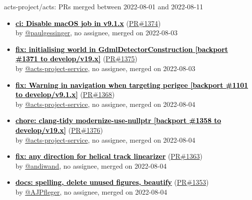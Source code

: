 \begin{frame}[allowframebreaks]{ acts-project/acts: PRs merged 
between 2022-08-01 and 2022-08-11
}
\begin{itemize}
    \item
    \prmerged\textbf{\href{https://github.com/acts-project/acts/pull/1374}{\textcolor{black}{ci: Disable macOS job in v9.1.x}}}
    (\href{https://github.com/acts-project/acts/pull/1374}{PR\#1374}) \\
    by \href{https://github.com/paulgessinger}{@paulgessinger}, {}no assignee, merged on 2022-08-03

    \item
    \prmerged\textbf{\href{https://github.com/acts-project/acts/pull/1375}{\textcolor{black}{fix: initialising world in GdmlDetectorConstruction [backport \#1371 to develop/v19.x]}}}
    (\href{https://github.com/acts-project/acts/pull/1375}{PR\#1375}) \\
    by \href{https://github.com/acts-project-service}{@acts-project-service}, {}no assignee, merged on 2022-08-03

    \item
    \prmerged\textbf{\href{https://github.com/acts-project/acts/pull/1368}{\textcolor{black}{fix: Warning in navigation when targeting perigee [backport \#1101 to develop/v9.1.x]}}}
    (\href{https://github.com/acts-project/acts/pull/1368}{PR\#1368}) \\
    by \href{https://github.com/acts-project-service}{@acts-project-service}, {}no assignee, merged on 2022-08-04

    \item
    \prmerged\textbf{\href{https://github.com/acts-project/acts/pull/1376}{\textcolor{black}{chore: clang-tidy modernize-use-nullptr [backport \#1358 to develop/v19.x]}}}
    (\href{https://github.com/acts-project/acts/pull/1376}{PR\#1376}) \\
    by \href{https://github.com/acts-project-service}{@acts-project-service}, {}no assignee, merged on 2022-08-04

    \item
    \prmerged\textbf{\href{https://github.com/acts-project/acts/pull/1363}{\textcolor{black}{fix: any direction for helical track linearizer}}}
    (\href{https://github.com/acts-project/acts/pull/1363}{PR\#1363}) \\
    by \href{https://github.com/andiwand}{@andiwand}, {}no assignee, merged on 2022-08-04

    \item
    \prmerged\textbf{\href{https://github.com/acts-project/acts/pull/1353}{\textcolor{black}{docs: spelling, delete unused figures, beautify}}}
    (\href{https://github.com/acts-project/acts/pull/1353}{PR\#1353}) \\
    by \href{https://github.com/AJPfleger}{@AJPfleger}, {}no assignee, merged on 2022-08-04


\end{itemize}
\end{frame}
